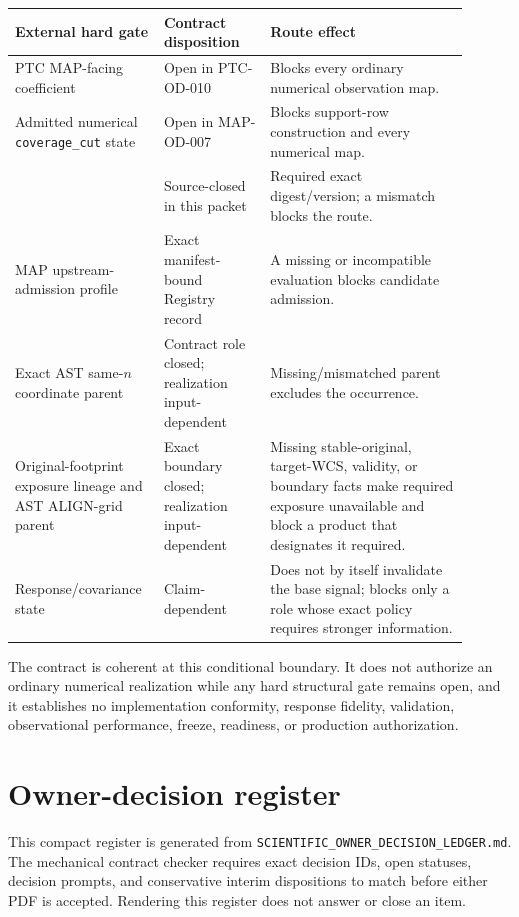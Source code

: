 \documentclass[10pt]{article}
\newcommand{\code}[1]{\nolinkurl{#1}}
\begin{document}
\begin{longtable}{L{0.27\linewidth}L{0.22\linewidth}L{0.41\linewidth}}
\toprule
External hard gate & Contract disposition & Route effect\\
\midrule
PTC MAP-facing coefficient & Open in PTC-OD-010 & Blocks every ordinary numerical observation map.\\
Admitted numerical \code{coverage\_cut} state & Open in MAP-OD-007 & Blocks support-row construction and every numerical map.\\
\SCIMapPTCMapBoundaryId{} & Source-closed in this packet & Required exact digest/version; a mismatch blocks the route.\\
MAP upstream-admission profile & Exact manifest-bound Registry record & A
missing or incompatible \SCIMapUpstreamProfile{} evaluation blocks candidate
admission.\\
Exact AST same-\(n\) coordinate parent & Contract role closed; realization input-dependent & Missing/mismatched parent excludes the occurrence.\\
Original-footprint exposure lineage and AST ALIGN-grid parent & Exact boundary closed; realization input-dependent & Missing stable-original, target-WCS, validity, or boundary facts make required exposure unavailable and block a product that designates it required.\\
Response/covariance state & Claim-dependent & Does not by itself invalidate the base signal; blocks only a role whose exact policy requires stronger information.\\
\bottomrule
\end{longtable}

The contract is coherent at this conditional boundary. It does not authorize
an ordinary numerical realization while any hard structural gate remains
open, and it establishes no implementation conformity, response fidelity,
validation, observational performance, freeze, readiness, or production
authorization.

\appendix
\clearpage
\section{Owner-decision register}\label{app:owner-decisions}

This compact register is generated from
\code{SCIENTIFIC_OWNER_DECISION_LEDGER.md}. The mechanical contract checker
requires exact decision IDs, open statuses, decision prompts, and conservative
interim dispositions to match before either PDF is accepted. Rendering this
register does not answer or close an item.
\end{document}
